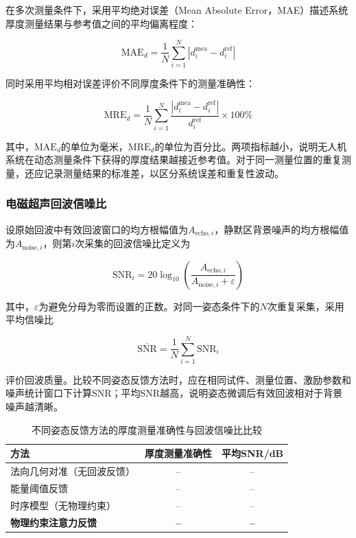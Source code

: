 在多次测量条件下，采用平均绝对误差（Mean Absolute Error，MAE）描述系统厚度测量结果与参考值之间的平均偏离程度：

\begin{equation}
\mathrm{MAE}_{d}=\frac{1}{N}\sum_{i=1}^{N}\left|d_i^{\mathrm{mea}}-d_i^{\mathrm{ref}}\right|
\label{eq:thickness_mae}
\end{equation}

同时采用平均相对误差评价不同厚度条件下的测量准确性：

\begin{equation}
\mathrm{MRE}_{d}=\frac{1}{N}\sum_{i=1}^{N}\frac{\left|d_i^{\mathrm{mea}}-d_i^{\mathrm{ref}}\right|}{d_i^{\mathrm{ref}}}\times 100\%
\label{eq:thickness_mre}
\end{equation}

其中，$\mathrm{MAE}_{d}$的单位为毫米，$\mathrm{MRE}_{d}$的单位为百分比。两项指标越小，说明无人机系统在动态测量条件下获得的厚度结果越接近参考值。对于同一测量位置的重复测量，还应记录测量结果的标准差，以区分系统误差和重复性波动。

\subsubsection{电磁超声回波信噪比}

设原始回波中有效回波窗口的均方根幅值为$A_{\mathrm{echo},i}$，静默区背景噪声的均方根幅值为$A_{\mathrm{noise},i}$，则第$i$次采集的回波信噪比定义为

\begin{equation}
\mathrm{SNR}_i=20\log_{10}\left(\frac{A_{\mathrm{echo},i}}{A_{\mathrm{noise},i}+\varepsilon}\right)
\label{eq:echo_snr}
\end{equation}

其中，$\varepsilon$为避免分母为零而设置的正数。对同一姿态条件下的$N$次重复采集，采用平均信噪比

\begin{equation}
\overline{\mathrm{SNR}}=\frac{1}{N}\sum_{i=1}^{N}\mathrm{SNR}_i
\label{eq:mean_echo_snr}
\end{equation}

评价回波质量。比较不同姿态反馈方法时，应在相同试件、测量位置、激励参数和噪声统计窗口下计算SNR；平均SNR越高，说明姿态微调后有效回波相对于背景噪声越清晰。

\begin{table}[htbp]
\centering
\caption{不同姿态反馈方法的厚度测量准确性与回波信噪比比较}
\label{tab:c4_attitude_results}
\begin{tabular}{lcc}
\toprule
\textbf{方法} & \textbf{厚度测量准确性} & \textbf{平均SNR/dB} \\
\midrule
法向几何对准（无回波反馈） & -- & -- \\
能量阈值反馈 & -- & -- \\
时序模型（无物理约束） & -- & -- \\
\textbf{物理约束注意力反馈} & \textbf{--} & \textbf{--} \\
\bottomrule
\end{tabular}
\end{table}

